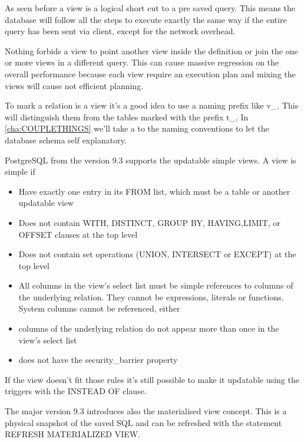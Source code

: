 As seen before a view is a logical short cut to a pre saved query. This means 
the database will follow all the steps to execute exactly the same way if the 
entire query has been sent via client, except for the network overhead.

Nothing forbids a view to point another view inside the definition or join 
the one or more views in a different query. This can cause massive 
regression on the overall performance because each view require an execution 
plan and mixing the views will cause not efficient planning. 

To mark a relation is a view it's a good idea to use a naming prefix like v\_. 
This will distinguish them from the tables marked with the prefix t\_.
In \ref{cha:COUPLETHINGS} we'll take a to the naming conventions to let the 
database schema self explanatory.

PostgreSQL from the version 9.3 supports the updatable simple views. 
A view is simple if

\begin{itemize}


 \item   Have exactly one entry in its FROM list, which must be a table or 
another updatable view

 \item Does not contain WITH, DISTINCT, GROUP BY, HAVING,LIMIT, or OFFSET 
clauses at the top level

 \item  Does not contain set operations (UNION, INTERSECT or EXCEPT) at the 
top level

 \item   All columns in the view's select list must be simple references to 
columns of the underlying relation. They cannot be expressions, literals or 
functions. System columns cannot be referenced, either

 \item   columns of the underlying relation do not appear more than once in 
the view's select list

 \item   does not have the security\_barrier property

\end{itemize}

If the view doesn't fit those rules it's still possible to make it updatable 
using the triggers with the INSTEAD OF clause.

The major version 9.3 introduces also the materialised view concept. This is a 
physical snapshot of the saved SQL and can be refreshed with the statement 
REFRESH MATERIALIZED VIEW.  


